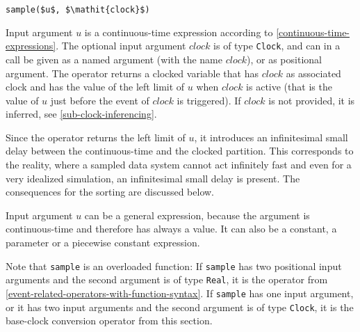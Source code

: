 \begin{operatordefinition*}[sample]\label{modelica:clocked-sample}
\begin{synopsis}\begin{lstlisting}
sample($u$, $\mathit{clock}$)
\end{lstlisting}\end{synopsis}
\begin{semantics}
Input argument $u$ is a continuous-time expression according to \cref{continuous-time-expressions}.
The optional input argument $\mathit{clock}$ is of type \lstinline!Clock!, and can in a call be given as a named argument (with the name $\mathit{clock}$), or as positional argument.
The operator returns a clocked variable that has $\mathit{clock}$ as associated clock and has the value of the left limit of $u$ when $\mathit{clock}$ is active (that is the value of $u$ just before the event of $\mathit{clock}$ is triggered).
If $\mathit{clock}$ is not provided, it is inferred, see \cref{sub-clock-inferencing}.
\begin{nonnormative}
Since the operator returns the left limit of $u$, it introduces an infinitesimal small delay between the continuous-time and the clocked partition.
This corresponds to the reality, where a sampled data system cannot act infinitely fast and even for a very idealized simulation, an infinitesimal small delay is present.
The consequences for the sorting are discussed below.

Input argument $u$ can be a general expression, because the argument is continuous-time and therefore has always a value.
It can also be a constant, a parameter or a piecewise constant expression.

Note that \lstinline!sample! is an overloaded function:
If \lstinline!sample! has two positional input arguments and the second argument is of type \lstinline!Real!, it is the operator from \cref{event-related-operators-with-function-syntax}.
If \lstinline!sample! has one input argument, or it has two input arguments and the second argument is of type \lstinline!Clock!, it is the base-clock conversion operator from this section.
\end{nonnormative}
\end{semantics}
\end{operatordefinition*}

